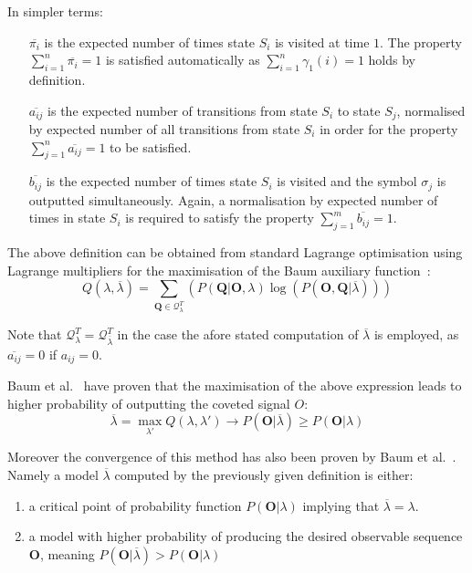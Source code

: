 \begin{samepage}

In simpler terms:
\begin{itemize}
\item[$\overline{\pi_i}$] is the expected number of times state $S_i$ is visited at time $1$. The property $\sum_{i=1}^n\overline{\pi_i}=1$ is satisfied automatically as $\sum_{i=1}^n\gamma_1(i)=1$ holds by definition.
\item[$\overline{a_{ij}}$] is the expected number of transitions from state $S_i$ to state $S_j$, normalised by expected number of all transitions from state $S_i$ in order for the property $\sum_{j=1}^n\overline{a_{ij}}=1$ to be satisfied.
\item[$\overline{b_{ij}}$] is the expected number of times state $S_i$ is visited and the symbol $\sigma_j$ is outputted simultaneously. Again, a normalisation by expected number of times in state $S_i$ is required to satisfy the property $\sum_{j=1}^m\overline{b_{ij}}=1$.
\end{itemize}
\end{samepage}

The above definition can be obtained from standard Lagrange optimisation using Lagrange multipliers for the maximisation of the Baum auxiliary function~\cite{Rabiner89hmm}:
$$Q(\lambda,\overline{\lambda})=\sum_{\mathbf{Q}\in\mathcal{Q}^T_\lambda}(P(\mathbf{Q}|\mathbf{O},\lambda)\log(P(\mathbf{O},\mathbf{Q}|\overline{\lambda})))$$

Note that $\mathcal{Q}^T_\lambda = \mathcal{Q}^T_{\overline{\lambda}}$ in the case the afore stated computation of $\overline{\lambda}$ is employed, as $\overline{a_{ij}}=0$ if $a_{ij}=0$.

Baum et al.~\cite{baum1968, baum1970, baker1975} have proven that the maximisation of the above expression leads to higher probability of outputting the coveted signal $O$:
$$\overline{\lambda}=\max_{\lambda'}{Q(\lambda,\lambda')} \rightarrow P(\mathbf{O}|\overline{\lambda}) \geq P(\mathbf{O}|\lambda)$$

Moreover the convergence of this method has also been proven by Baum et al.~\cite{baum1968, baker1975}. Namely a model $\overline{\lambda}$ computed by the previously given definition is either:
\begin{enumerate}
\item a critical point of probability function $P(\mathbf{O}|\lambda)$ implying that $\overline{\lambda}=\lambda$.
\item a model with higher probability of producing the desired observable sequence $\mathbf{O}$, meaning $P(\mathbf{O}|\overline{\lambda}) > P(\mathbf{O}|\lambda)$
\end{enumerate}

